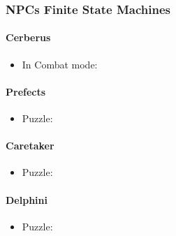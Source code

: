 \subsubsection{NPCs Finite State Machines}

\paragraph{Cerberus}
\begin{itemize}
\item In Combat mode: 
\end{itemize}
\pagebreak

\paragraph{Prefects}
\begin{itemize}
\item Puzzle: 
\end{itemize}
\pagebreak

\paragraph{Caretaker}
\begin{itemize}
\item Puzzle: 
\end{itemize}
\pagebreak

\paragraph{Delphini}
\begin{itemize}
\item Puzzle: 
\end{itemize}
\pagebreak